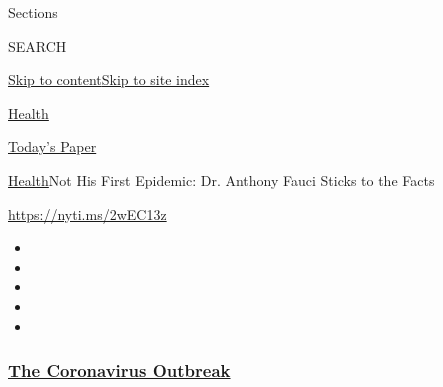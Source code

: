 Sections

SEARCH

\protect\hyperlink{site-content}{Skip to
content}\protect\hyperlink{site-index}{Skip to site index}

\href{https://www.nytimes3xbfgragh.onion/section/health}{Health}

\href{https://myaccount.nytimes3xbfgragh.onion/auth/login?response_type=cookie\&client_id=vi}{}

\href{https://www.nytimes3xbfgragh.onion/section/todayspaper}{Today's
Paper}

\href{/section/health}{Health}\textbar{}Not His First Epidemic: Dr.
Anthony Fauci Sticks to the Facts

\url{https://nyti.ms/2wEC13z}

\begin{itemize}
\item
\item
\item
\item
\item
\end{itemize}

\hypertarget{the-coronavirus-outbreak}{%
\subsubsection{\texorpdfstring{\href{https://www.nytimes3xbfgragh.onion/news-event/coronavirus?name=styln-coronavirus-national\&region=TOP_BANNER\&block=storyline_menu_recirc\&action=click\&pgtype=Article\&impression_id=ccd65240-f52e-11ea-b984-0101ae12a377\&variant=undefined}{The
Coronavirus
Outbreak}}{The Coronavirus Outbreak}}\label{the-coronavirus-outbreak}}

